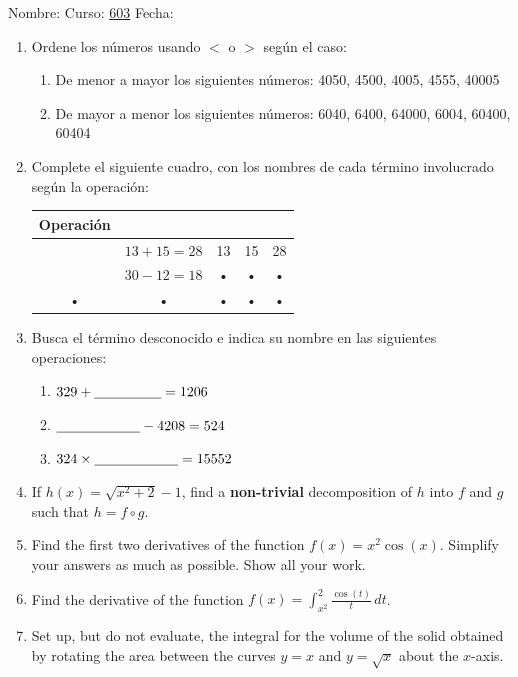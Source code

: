 \documentclass[fleqn]{article}
\newcommand{\LineaNombre}{%
\par
\vspace{\baselineskip}
Nombre:\hrulefill \; Curso: \underline{603} \; Fecha: \underline{\hspace*{2.5cm}} \relax
\par}
\let\ds\displaystyle
\begin{document}
\LineaNombre
\begin{enumerate}
   \item Ordene los números usando $<$ o $>$ según el caso: 
      \begin{enumerate}
	 \item De menor a mayor los siguientes números: 4050, 4500, 4005, 4555, 40005\answer
	 \item De mayor a menor los siguientes números: 6040, 6400, 64000, 6004, 60400, 60404\answer
      \end{enumerate}
  \item Complete el siguiente cuadro, con los nombres de cada término involucrado según la operación:
  \begin{tabular}{|c|c|c|c|c|}
\hline 
Operación &  &  &  &  \\ 
\hline 
 & $13+15=28$ & 13 & 15 & 28 \\ 
\hline 
 & $30-12=18$ & • & • & • \\ 
\hline 
• & • & • & • & • \\ 
\hline 
\end{tabular} 
   \item Busca el término desconocido e indica su nombre en las siguientes operaciones:
   \begin{enumerate}
   \item $329+\underline{\hspace*{48pt}}=1206$\noanswer
   \item $\underline{\hspace*{60pt}}-4208=524$\noanswer
   \item $324\times \underline{\hspace*{60pt}}=15552 $\noanswer
   \end{enumerate}
      \newpage
   \item If $h(x) = \sqrt{x^2 + 2} - 1$, find a \textbf{non-trivial} decomposition of $h$ into $f$ and $g$ such that $h = f\circ g$.
   \item Find the first two derivatives of the function $f(x) = x^2\cos(x)$.  Simplify
      your answers as much as possible.  Show all your work.
      \newpage
   \item Find the derivative of the function $\ds{f(x) = \int_{x^2}^2
      \frac{\cos(t)}{t} \,dt}$.
   \item Set up, but do not evaluate, the integral for the volume of the solid obtained by rotating the area between the curves $y = x$ and $y = \sqrt{x}$ about the $x$-axis.\noanswer
\end{enumerate}
\end{document}
